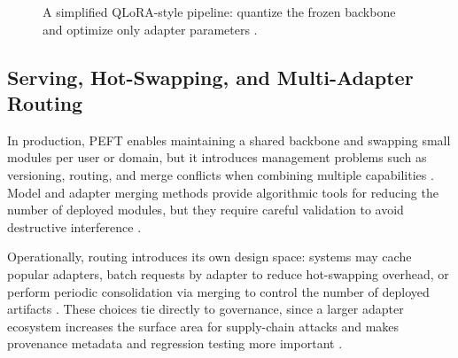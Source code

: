 \documentclass[conference]{IEEEtran}
\begin{document}
\begin{figure}[t]
     \centering
    \caption{A simplified QLoRA-style pipeline: quantize the frozen backbone and optimize only adapter parameters \cite{dettmers2023qlora}.}
    \label{fig:qlora-pipeline}
\end{figure}

\subsection{Serving, Hot-Swapping, and Multi-Adapter Routing}
In production, PEFT enables maintaining a shared backbone and swapping small modules per user or domain, but it introduces management problems such as versioning, routing, and merge conflicts when combining multiple capabilities \cite{pfeiffer2020adapterhub,yadav2023ties}. Model and adapter merging methods provide algorithmic tools for reducing the number of deployed modules, but they require careful validation to avoid destructive interference \cite{he2023mera,gauthiercaron2024merging,yadav2024what}.

Operationally, routing introduces its own design space: systems may cache popular adapters, batch requests by adapter to reduce hot-swapping overhead, or perform periodic consolidation via merging to control the number of deployed artifacts \cite{pfeiffer2020adapterhub,yadav2023ties,gauthiercaron2024merging}. These choices tie directly to governance, since a larger adapter ecosystem increases the surface area for supply-chain attacks and makes provenance metadata and regression testing more important \cite{sun2024peftguard,liu2024loratk}.
\end{document}
